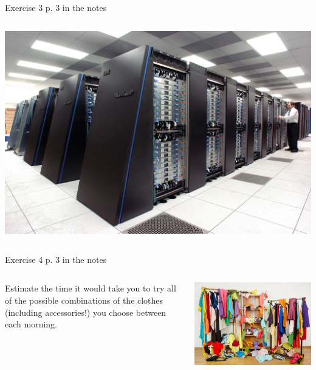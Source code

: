\documentclass[10pt]{beamer}
\begin{document}
\begin{frame}
\begin{block}{Exercise 3 p. 3 in the notes}
\begin{columns}
\begin{column}{0.3\linewidth}
      \includegraphics[width=\linewidth]{img/IBM_Blue_Gene_P_supercomputer.jpg}
    \end{column}
    \end{columns}
  \end{block}
  \begin{block}{Exercise 4 p. 3 in the notes}
    \begin{columns}
      \begin{column}{0.6\linewidth}
   Estimate the time it would take you to try all of the possible combinations of the clothes (including accessories!) you choose between each morning. 
      \end{column}
      \begin{column}{0.3\linewidth}
      \includegraphics[width=\linewidth]{img/wardrobe.png}
      \end{column}
    \end{columns}
  \end{block}
\end{frame}
\end{document}
